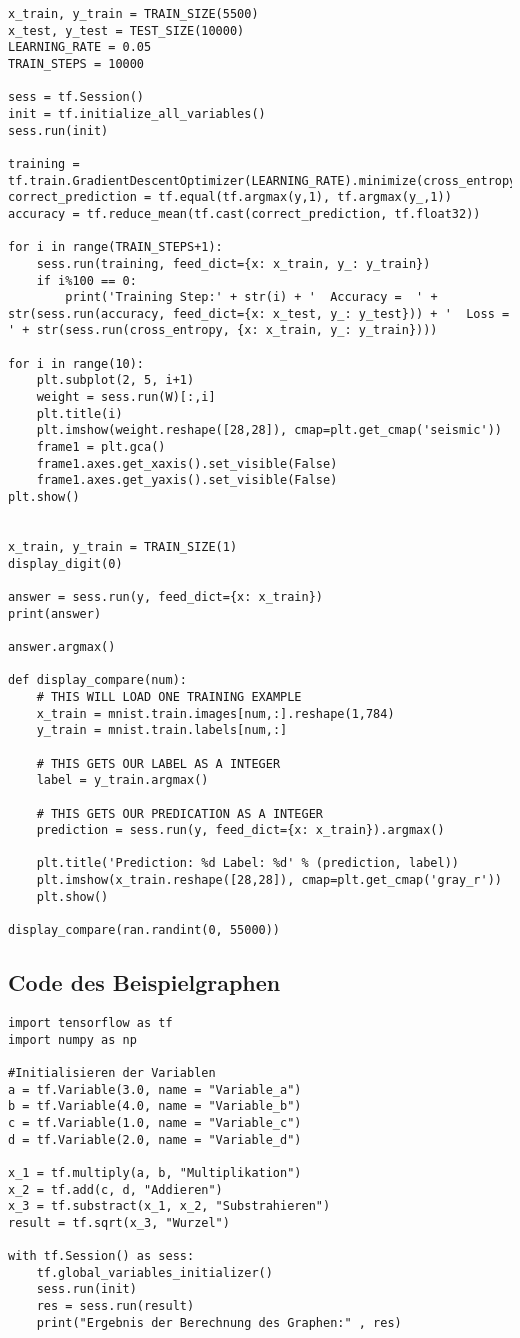 \begin{lstlisting}
x_train, y_train = TRAIN_SIZE(5500)
x_test, y_test = TEST_SIZE(10000)
LEARNING_RATE = 0.05
TRAIN_STEPS = 10000

sess = tf.Session()
init = tf.initialize_all_variables()
sess.run(init)

training = tf.train.GradientDescentOptimizer(LEARNING_RATE).minimize(cross_entropy)
correct_prediction = tf.equal(tf.argmax(y,1), tf.argmax(y_,1))
accuracy = tf.reduce_mean(tf.cast(correct_prediction, tf.float32))

for i in range(TRAIN_STEPS+1):
    sess.run(training, feed_dict={x: x_train, y_: y_train})
    if i%100 == 0:
        print('Training Step:' + str(i) + '  Accuracy =  ' + str(sess.run(accuracy, feed_dict={x: x_test, y_: y_test})) + '  Loss = ' + str(sess.run(cross_entropy, {x: x_train, y_: y_train})))
    
for i in range(10):
    plt.subplot(2, 5, i+1)
    weight = sess.run(W)[:,i]
    plt.title(i)
    plt.imshow(weight.reshape([28,28]), cmap=plt.get_cmap('seismic'))
    frame1 = plt.gca()
    frame1.axes.get_xaxis().set_visible(False)
    frame1.axes.get_yaxis().set_visible(False) 
plt.show()


x_train, y_train = TRAIN_SIZE(1) 
display_digit(0)

answer = sess.run(y, feed_dict={x: x_train})
print(answer)

answer.argmax()

def display_compare(num):
    # THIS WILL LOAD ONE TRAINING EXAMPLE
    x_train = mnist.train.images[num,:].reshape(1,784)
    y_train = mnist.train.labels[num,:]
    
    # THIS GETS OUR LABEL AS A INTEGER
    label = y_train.argmax()
    
    # THIS GETS OUR PREDICATION AS A INTEGER
    prediction = sess.run(y, feed_dict={x: x_train}).argmax() 
    
    plt.title('Prediction: %d Label: %d' % (prediction, label))
    plt.imshow(x_train.reshape([28,28]), cmap=plt.get_cmap('gray_r'))
    plt.show()

display_compare(ran.randint(0, 55000))
\end{lstlisting}


\subsection{Code des Beispielgraphen}
\label{sec:codeBeispielGraph}
\begin{lstlisting}
import tensorflow as tf
import numpy as np

#Initialisieren der Variablen
a = tf.Variable(3.0, name = "Variable_a")
b = tf.Variable(4.0, name = "Variable_b")
c = tf.Variable(1.0, name = "Variable_c")
d = tf.Variable(2.0, name = "Variable_d")

x_1 = tf.multiply(a, b, "Multiplikation")
x_2 = tf.add(c, d, "Addieren")
x_3 = tf.substract(x_1, x_2, "Substrahieren")
result = tf.sqrt(x_3, "Wurzel")

with tf.Session() as sess:
	tf.global_variables_initializer()
	sess.run(init)
	res = sess.run(result)
	print("Ergebnis der Berechnung des Graphen:" , res)
\end{lstlisting}